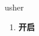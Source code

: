 
\begin{frame}
{\huge usher}
\begin{center}
\begin{enumerate}\Large
  \item \textbf{开启}
\end{enumerate}
\end{center}
\end{frame}
